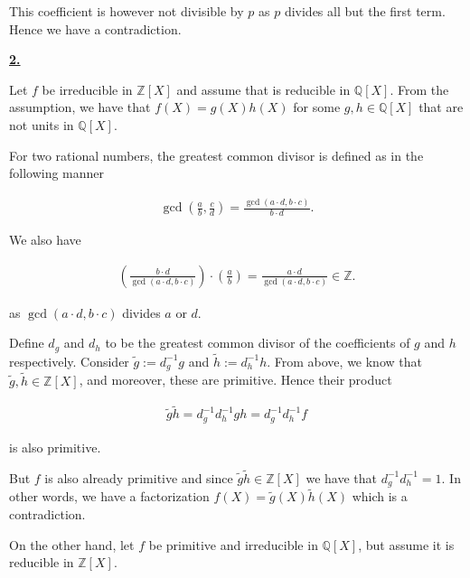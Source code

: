 \documentclass[a4paper]{article}
\theoremstyle{definition}
\begin{document}
\noindent This coefficient is however not divisible by \(p\) as \(p\) divides all but the first term. Hence we have a contradiction.

\noindent \underline{\textbf{2.}}

\noindent Let \(f\) be irreducible in \(\mathbb{Z}[X]\) and assume that is reducible in \(\mathbb{Q}[X]\). From the assumption, we have that \(f(X) = g(X)h(X)\) for some \(g, h \in \mathbb{Q}[X]\) that are not units in \(\mathbb{Q}[X]\).

\bigskip

\noindent For two rational numbers, the greatest common divisor is defined as in the following manner

\begin{align}
    \gcd \left( \frac{a}{b}, \frac{c}{d} \right) = \frac{\gcd(a \cdot d, b \cdot c)} {b \cdot d} \text{.}
\end{align}

\noindent We also have

\begin{align}
    \left(\frac{b \cdot d}{\gcd(a \cdot d, b \cdot c)}\right) \cdot \left( \frac{a}{b} \right) = \frac{a \cdot d}{\gcd(a \cdot d, b \cdot c)} \in \mathbb{Z} \text{.}
\end{align}

\noindent as \(\gcd(a \cdot d, b \cdot c)\) divides \(a\) or \(d\).

\bigskip

\noindent Define \(d_g\) and \(d_h\) to be the greatest common divisor of the coefficients of \(g\) and \(h\) respectively. Consider \(\tilde{g} := d_g^{-1} g\) and \(\tilde{h} := d_h^{-1} h\). From above, we know that \(\tilde{g}, \tilde{h} \in \mathbb{Z}[X]\), and moreover, these are primitive. Hence their product

\begin{align}
    \tilde{g}\tilde{h} = d_g^{-1} d_h^{-1} g h = d_g^{-1} d_h^{-1} f
\end{align}

\noindent is also primitive.

\bigskip

\noindent But \(f\) is also already primitive and since \(\tilde{g}\tilde{h} \in \mathbb{Z}[X]\) we have that \(d_g^{-1} d_h^{-1} = 1\). In other words, we have a factorization \(f(X) = \tilde{g}(X) \tilde{h}(X)\) which is a contradiction.

\bigskip
\bigskip

\noindent On the other hand, let \(f\) be primitive and irreducible in \(\mathbb{Q}[X]\), but assume it is reducible in \(\mathbb{Z}[X]\).
\end{document}
